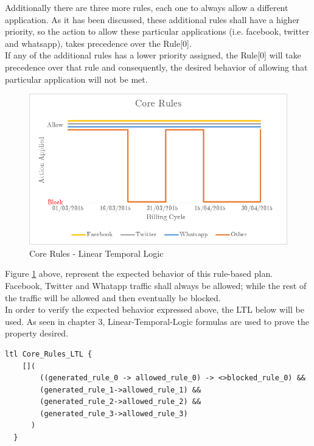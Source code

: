 Additionally there are three more rules, each one to always allow a different application. As it has been discussed, these additional rules shall have a higher priority, so the action to allow these particular applications (i.e.  facebook, twitter and whatsapp), takes precedence over the Rule[0].\\

If any of the additional rules has a lower priority assigned, the Rule[0] will take precedence over that rule and consequently, the desired behavior of allowing that particular application will not be met. \\

\begin{figure}[H]
\centering
\includegraphics[width=1.00\textwidth]{image/Plans_CoreRules}
\caption{Core Rules - Linear Temporal Logic}
\label{coreRules}
\end{figure}

Figure \ref{coreRules} above, represent the expected behavior of this rule-based plan. Facebook, Twitter and Whatapp traffic shall always be allowed; while the rest of the traffic will be allowed and then eventually be blocked.  \\

In order to verify the expected behavior expressed above, the LTL below will be used. As seen in chapter 3, Linear-Temporal-Logic formulas are used to prove the property desired. 

\singlespacing
\begin{lstlisting}[caption=Core-Rules LTL,
  label=CoreLTL]
  ltl Core_Rules_LTL {
    []( 
        ((generated_rule_0 -> allowed_rule_0) -> <>blocked_rule_0) &&
    	(generated_rule_1->allowed_rule_1) &&
        (generated_rule_2->allowed_rule_2) &&
        (generated_rule_3->allowed_rule_3) 
      )
  }
\end{lstlisting}
\doublespacing

